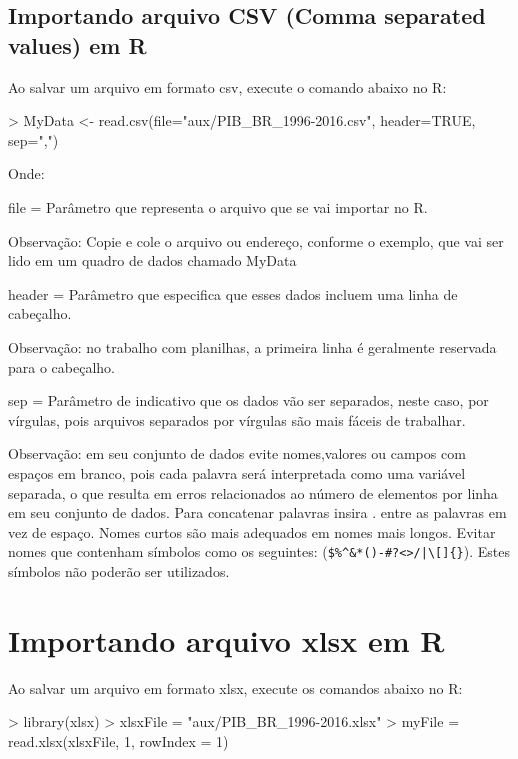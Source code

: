 \documentclass[12pt,a4paper,oneside]{erdc}
\begin{document}
\subsection{Importando arquivo CSV (Comma separated values) em R}


Ao salvar um arquivo em formato csv, execute o comando abaixo no R:

\begin{Schunk}
\begin{Sinput}
> MyData <- read.csv(file="aux/PIB_BR_1996-2016.csv", header=TRUE, sep=",")
\end{Sinput}
\end{Schunk}

Onde:

file = Parâmetro que representa o arquivo que se vai importar no R. 

Observação: Copie e cole o arquivo ou endereço, conforme o exemplo, que vai ser lido em um quadro de dados chamado MyData

header = Parâmetro que especifica que esses dados incluem uma linha de cabeçalho.
 
 Observação: no trabalho com planilhas, a primeira linha é geralmente reservada para o cabeçalho.

sep = Parâmetro de indicativo que os dados vão ser separados, neste caso, por vírgulas, pois arquivos separados por vírgulas são mais fáceis de trabalhar.

Observação: em seu conjunto de dados evite nomes,valores ou campos com espaços em branco, pois cada palavra será interpretada como uma variável separada, o que resulta em erros relacionados ao número de elementos por linha em seu conjunto de dados. Para concatenar palavras insira . entre as palavras em vez de espaço. Nomes curtos são mais adequados em nomes mais longos. Evitar nomes que contenham símbolos como os seguintes: (\verb+$%^&*()-#?<>/|\[]{}+). Estes símbolos não poderão ser utilizados.

\section{Importando arquivo xlsx em R  }

Ao salvar um arquivo em formato xlsx, execute os comandos abaixo no R:

\begin{Schunk}
\begin{Sinput}
> library(xlsx)
> xlsxFile = "aux/PIB_BR_1996-2016.xlsx"
> myFile = read.xlsx(xlsxFile, 1, rowIndex = 1)
\end{Sinput}
\end{Schunk}
\end{document}

